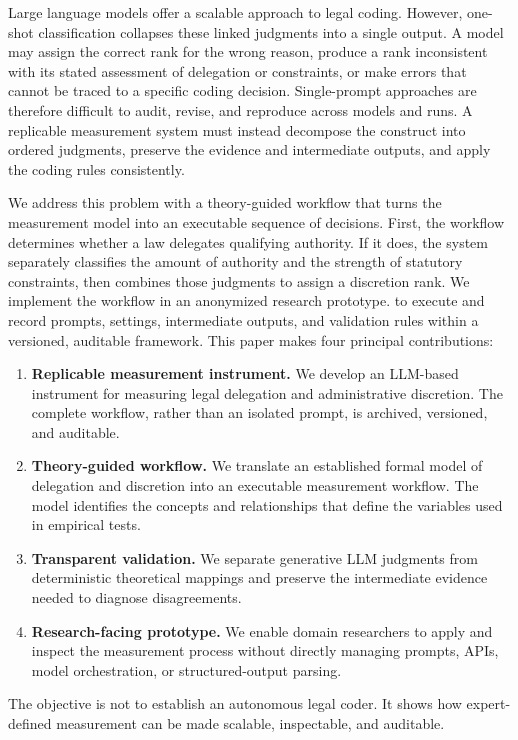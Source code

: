 \documentclass[runningheads]{llncs}
\newcommand{\systemname}{an anonymized research prototype.}
\begin{document}
Large language models offer a scalable approach to legal coding. However, one-shot classification collapses these linked judgments into a single output. A model may assign the correct rank for the wrong reason, produce a rank inconsistent with its stated assessment of delegation or constraints, or make errors that cannot be traced to a specific coding decision. Single-prompt approaches are therefore difficult to audit, revise, and reproduce across models and runs. A replicable measurement system must instead decompose the construct into ordered judgments, preserve the evidence and intermediate outputs, and apply the coding rules consistently.

We address this problem with a theory-guided workflow that turns the measurement model into an executable sequence of decisions. First, the workflow determines whether a law delegates qualifying authority. If it does, the system separately classifies the amount of authority and the strength of statutory constraints, then combines those judgments to assign a discretion rank. We implement the workflow in \systemname{} to execute and record prompts, settings, intermediate outputs, and validation rules within a versioned, auditable framework. This paper makes four principal contributions:
\begin{enumerate}[nosep,leftmargin=*]
    \item \textbf{Replicable measurement instrument.} We develop an LLM-based instrument for measuring legal delegation and administrative discretion. The complete workflow, rather than an isolated prompt, is archived, versioned, and auditable.
    \item \textbf{Theory-guided workflow.} We translate an established formal model of delegation and discretion into an executable measurement workflow. The model identifies the concepts and relationships that define the variables used in empirical tests.
    \item \textbf{Transparent validation.} We separate generative LLM judgments from deterministic theoretical mappings and preserve the intermediate evidence needed to diagnose disagreements.
    \item \textbf{Research-facing prototype.} We enable domain researchers to apply and inspect the measurement process without directly managing prompts, APIs, model orchestration, or structured-output parsing.
\end{enumerate}

The objective is not to establish an autonomous legal coder. It shows how expert-defined measurement can be made scalable, inspectable, and auditable.
\end{document}
